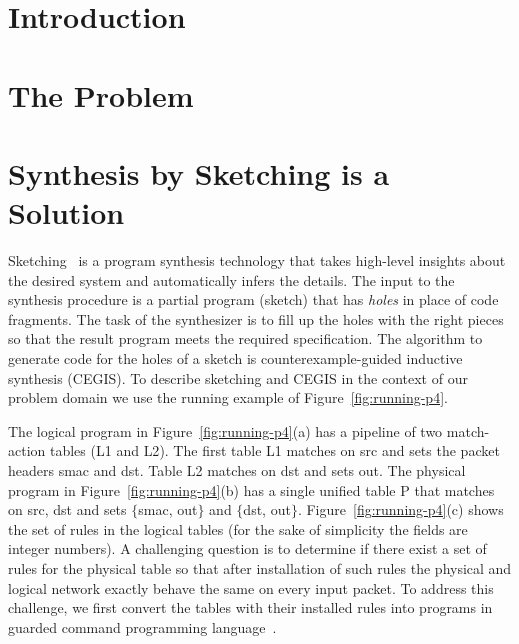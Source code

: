 \lstset{language=C}

\section{Introduction}


\section{The Problem}

\section{Synthesis by Sketching is a Solution}


Sketching~\cite{armando-thesis,armando2013sketch} is a program synthesis technology that 
takes high-level insights about the desired system and automatically infers the details.
The input to the synthesis procedure is a partial program (sketch) that has {\em holes}
in place of code fragments.
The task of the synthesizer is to fill up the holes with the right pieces so that the 
result program meets the required specification.  
The algorithm to generate code for the holes of a sketch is counterexample-guided inductive synthesis (CEGIS).
To describe sketching and CEGIS in the context of our problem domain we use the running 
example of Figure~\ref{fig:running-p4}.




The logical program in Figure~\ref{fig:running-p4}(a) has a pipeline of two match-action 
tables ({\ttfamily L1} and {\ttfamily L2}).
The first table {\ttfamily L1} matches on {\ttfamily src} and sets the packet headers
{\ttfamily smac} and {\ttfamily dst}.
Table {\ttfamily L2} matches on {\ttfamily dst} and sets {\ttfamily out}.
The physical program in Figure~\ref{fig:running-p4}(b) has a single unified table {\ttfamily P}
that matches on {\ttfamily src}, {\ttfamily dst} and sets $\{${\ttfamily smac}, {\ttfamily out}$\}$
and $\{${\ttfamily dst}, {\ttfamily out}$\}$.
Figure~\ref{fig:running-p4}(c) shows the set of rules in the logical tables
(for the sake of simplicity the fields are integer numbers).
A challenging question is to determine if there exist a set of rules for the physical table 
so that after installation of such rules the physical and logical network 
exactly behave the same on every input packet.
To address this challenge, we first convert the tables with their installed rules into programs
in guarded command programming language~\cite{dijkstra1975}.

